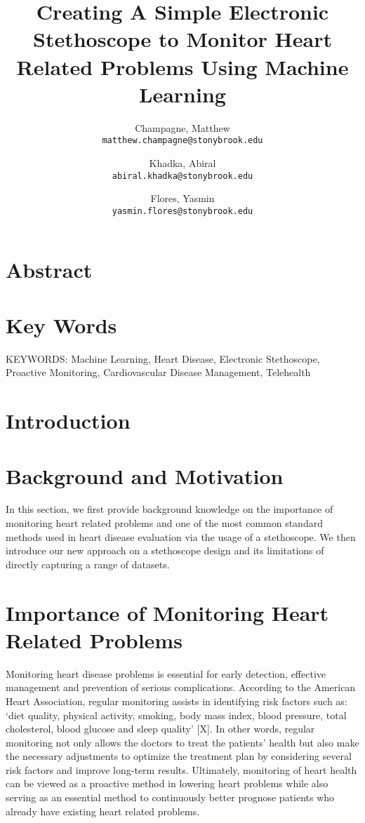 \documentclass[twocolumn]{article}
\begin{document}
\title{Creating A Simple Electronic Stethoscope to Monitor Heart Related Problems Using Machine Learning}
\author{
  Champagne, Matthew \\
  \texttt{matthew.champagne@stonybrook.edu}
  \and
  Khadka, Abiral \\
  \texttt{abiral.khadka@stonybrook.edu}
  \and
  Flores, Yasmin \\
  \texttt{yasmin.flores@stonybrook.edu}
}

\maketitle
\section{Abstract} 

\section{Key Words} 
KEYWORDS: Machine Learning, Heart Disease, Electronic Stethoscope, Proactive Monitoring, Cardiovascular Disease Management, Telehealth 

\section{Introduction}

\section{Background and Motivation} 
In this section, we first provide background knowledge on the importance of monitoring heart related problems and one of the most common standard methods used in heart disease evaluation via the usage of a stethoscope. We then introduce our new approach on a stethoscope design and its limitations of directly capturing a range of datasets.

\section{Importance of Monitoring Heart Related Problems} 
Monitoring heart disease problems is essential for early detection, effective management and prevention of serious complications. According to the American Heart Association, regular monitoring assists in identifying risk factors such as: ‘diet quality, physical activity, smoking, body mass index, blood pressure, total cholesterol, blood glucose and sleep quality’ [X]. In other words, regular monitoring not only allows the doctors to treat the patients’ health but also make the necessary adjustments to optimize the treatment plan by considering several risk factors and improve long-term results. Ultimately, monitoring of heart health can be viewed as a proactive method in lowering heart problems while also serving as an essential method to continuously better prognose patients who already have existing heart related problems. 
\end{document}
